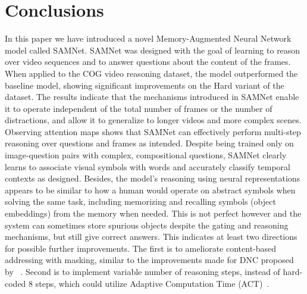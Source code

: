 \section{Conclusions}

In this paper we have introduced a novel Memory-Augmented Neural Network model called SAMNet.
SAMNet was designed with the goal of learning to reason over video sequences and to answer questions about the content of the frames.
When applied to the COG video reasoning dataset, the model outperformed the baseline model, showing significant improvements on the Hard variant of the dataset.
The results indicate that the mechanisms introduced in SAMNet  enable it to operate independent of the total number of frames or the number of distractions, and allow it to generalize to longer videos and more complex scenes. 
Observing attention maps shows that SAMNet can effectively perform multi-step reasoning over questions and frames as intended. 
Despite being trained only on image-question pairs with complex, compositional questions, SAMNet clearly learns
to associate visual symbols with words and accurately classify temporal contexts as designed.
Besides, the model's reasoning using neural representations appears to be similar to how a human would operate on abstract symbols when solving the same task, including memorizing and recalling symbols (object embeddings) from the memory when needed.
This is not perfect however and the system can sometimes store spurious objects despite the gating and reasoning mechanisms,
but still give correct answers.
This indicates at least two directions for possible further improvements.
The first is to ameliorate content-based addressing with masking, similar to the improvements made for DNC proposed by ~\cite{csordas2019improved}.
Second is to implement variable number of reasoning steps, instead of hard-coded 8 steps, which could utilize Adaptive Computation Time (ACT)~\cite{graves2016adaptive}.




